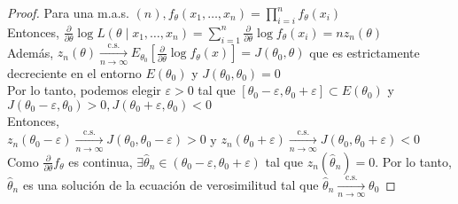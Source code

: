 \begin{proof}
  Para una m.a.s. $(n), f_{\theta}\left(x_{1}, \ldots, x_{n}\right)=\prod_{i=i}^{n} f_{\theta}\left(x_{i}\right)$\\
  Entonces, $\frac{\partial}{\partial \theta} \log L\left(\theta \mid x_{1}, \ldots, x_{n}\right)=\sum_{i=1}^{n} \frac{\partial}{\partial \theta} \log f_{\theta}\left(x_{i}\right)=n z_{n}(\theta)$\\
  Además, $z_{n}(\theta) \xrightarrow[n \rightarrow \infty]{\text { c.s. }} E_{\theta_{0}}\left[\frac{\partial}{\partial \theta} \log f_{\theta}(x)\right]=J\left(\theta_{0}, \theta\right)$ que es estrictamente decreciente en el entorno $E\left(\theta_{0}\right)$ y $J\left(\theta_{0}, \theta_{0}\right)=0$\\
  Por lo tanto, podemos elegir $\varepsilon>0$ tal que $\left[\theta_{0}-\varepsilon, \theta_{0}+\varepsilon\right] \subset E\left(\theta_{0}\right)$ y $J\left(\theta_{0}-\varepsilon, \theta_{0}\right)>0, J\left(\theta_{0}+\varepsilon, \theta_{0}\right)<0$\\
  Entonces,\\
  $z_{n}\left(\theta_{0}-\varepsilon\right) \xrightarrow[n \rightarrow \infty]{\text { c.s. }} J\left(\theta_{0}, \theta_{0}-\varepsilon\right)>0$ y $z_{n}\left(\theta_{0}+\varepsilon\right) \xrightarrow[n \rightarrow \infty]{\text { c.s. }} J\left(\theta_{0}, \theta_{0}+\varepsilon\right)<0$\\
  Como $\frac{\partial}{\partial \theta} f_{\theta}$ es continua, $\exists \hat{\theta}_{n} \in\left(\theta_{0}-\varepsilon, \theta_{0}+\varepsilon\right)$ tal que $z_{n}\left(\hat{\theta}_{n}\right)=0$. Por lo tanto, $\hat{\theta}_{n}$ es una solución de la ecuación de verosimilitud tal que $\hat{\theta}_{n} \xrightarrow[n \rightarrow \infty]{\text { c.s. }} \theta_{0}$
\end{proof}

